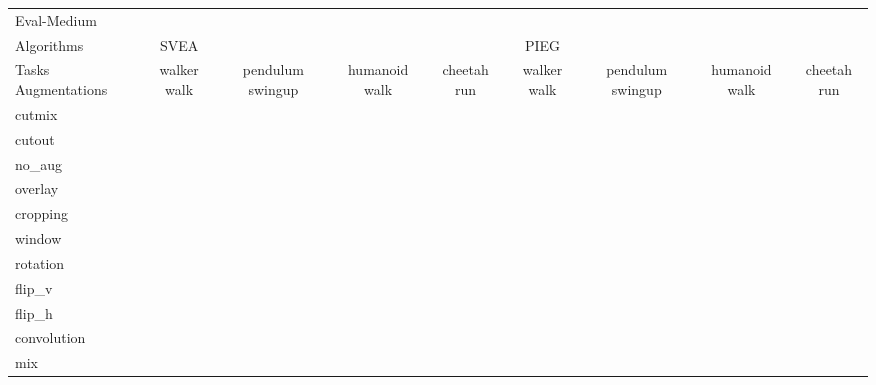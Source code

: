 \begin{tabular}{lcccccccc}
Eval-Medium & & & & & & & & \\
Algorithms & SVEA & & & & PIEG & & & \\
Tasks Augmentations & walker walk & pendulum swingup & humanoid walk & cheetah run & walker walk & pendulum swingup & humanoid walk & cheetah run \\
cutmix          &  &  &  &  &  &  &  &  \\
cutout          &  &  &  &  &  &  &  &  \\
no\_aug         &  &  &  &  &  &  &  &  \\
overlay         &  &  &  &  &  &  &  &  \\
cropping        &  &  &  &  &  &  &  &  \\
window          &  &  &  &  &  &  &  &  \\
rotation        &  &  &  &  &  &  &  &  \\
flip\_v         &  &  &  &  &  &  &  &  \\
flip\_h         &  &  &  &  &  &  &  &  \\
convolution     &  &  &  &  &  &  &  &  \\
mix             &  &  &  &  &  &  &  &  \\
\end{tabular}